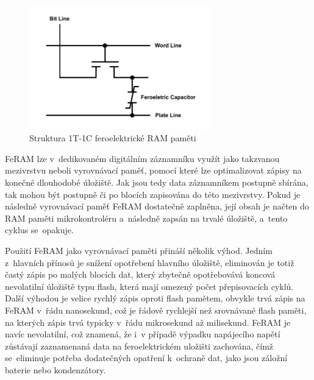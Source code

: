 \begin{figure}[h]
    \centering
    \includegraphics[width=0.70\textwidth]{obrazky-figures/fram_t1-c1.pdf}
    
    \caption{Struktura 1T-1C feroelektrické RAM paměti~\cite{ieee_feram_ultra_high_density_embedded_mem}}
    \label{fig:feram-1t-1c}
\end{figure}

FeRAM lze v~dedikovaném digitálním záznamníku využít jako takzvanou mezivrstvu neboli vyrovnávací paměť, pomocí které lze optimalizovat zápisy na konečné dlouhodobé úložiště. Jak jsou tedy data záznamníkem postupně sbírána, tak mohou být postupně či po blocích zapisována do této mezivrstvy. Pokud je následně vyrovnávací paměť FeRAM dostatečně zaplněna, její obsah je načten do RAM paměti mikrokontroléru a~následně zapsán na trvalé úložiště, a~tento cyklus se~opakuje.~\cite{ieee_feram_ultra_high_density_embedded_mem, non_volatile_memories}

Použití FeRAM jako vyrovnávací paměti přináší několik výhod. Jedním z~hlavních přínosů je snížení opotřebení hlavního úložiště, eliminován je totiž častý zápis po malých blocích dat, který zbytečně opotřebovává koncová nevolatilní úložiště typu flash, která mají omezený počet přepisovacích cyklů. Další výhodou je velice rychlý zápis oproti flash pamětem, obvykle trvá zápis na FeRAM v~řádu nanosekund, což je řádově rychlejší než srovnávané flash paměti, na kterých zápis trvá typicky v~řádu mikrosekund až milisekund. FeRAM je navíc nevolatilní, což znamená, že i~v případě výpadku napájecího napětí zůstávají zaznamenaná data na feroelektrickém uložišti zachována, čímž se~eliminuje potřeba dodatečných opatření k~ochraně dat, jako jsou záložní baterie nebo kondenzátory.~\cite{ieee_feram_ultra_high_density_embedded_mem, non_volatile_memories}

